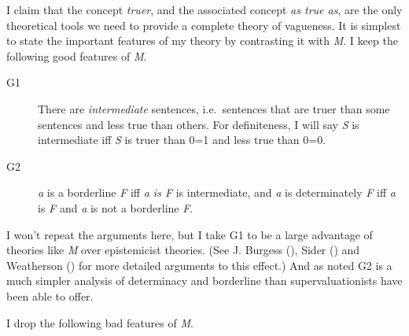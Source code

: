 \documentclass[
  10pt,
  letterpaper,
  DIV=11,
  numbers=noendperiod,
  twoside]{scrartcl}
\begin{document}
I claim that the concept \emph{truer}, and the associated concept
\emph{as true as}, are the only theoretical tools we need to provide a
complete theory of vagueness. It is simplest to state the important
features of my theory by contrasting it with \emph{M}. I keep the
following good features of \emph{M}.

\begin{description}
\item[G1]
There are \emph{intermediate} sentences, i.e.~sentences that are truer
than some sentences and less true than others. For definiteness, I will
say \emph{S} is intermediate iff \emph{S} is truer than 0=1 and less
true than 0=0.
\item[G2]
\emph{a} is a borderline \emph{F} iff \emph{a is F} is intermediate, and
\emph{a} is determinately \emph{F} iff \emph{a} is \emph{F} and \emph{a}
is not a borderline \emph{F}.
\end{description}

I won't repeat the arguments here, but I take G1 to be a large advantage
of theories like \emph{M} over epistemicist theories. (See J. Burgess
(), Sider
() and Weatherson
() for more detailed
arguments to this effect.) And as noted G2 is a much simpler analysis of
determinacy and borderline than supervaluationists have been able to
offer.

I drop the following bad features of \emph{M}.
\end{document}

